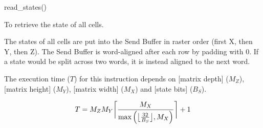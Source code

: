 

\format

read\_states()

\purpose

To retrieve the state of all cells.

\description

The states of all cells are put into the Send Buffer in raster order (first X, then Y, then Z).
The Send Buffer is word-aligned after each row by padding with 0.
If a state would be split across two words, it is instead aligned to the next word.

\notes

The execution time ($T$) for this instruction depends on [matrix depth] ($M_Z$), [matrix height] ($M_Y$), [matrix width] ($M_X$) and [state bits] ($B_S$).

$$ T = M_Z M_Y \ceil[\bigg]{ \frac{M_X}{\max \left( \floor[\big]{ \frac{32}{B_S} }, M_X \right)} } + 1 $$
